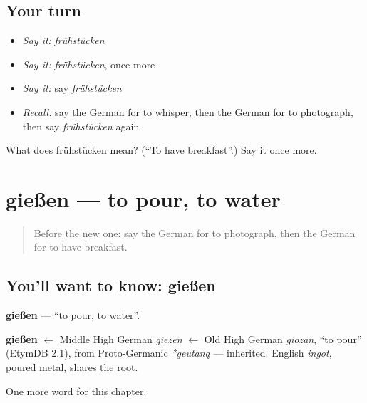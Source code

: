 \subsection*{Your turn}
\begin{itemize}
\raggedright
  \item \emph{Say it:} \emph{frühstücken}
  \item \emph{Say it:} \emph{frühstücken}, once more
  \item \emph{Say it:} say \emph{frühstücken}
  \item \emph{Recall:} say the German for to whisper, then the German for to photograph, then say \emph{frühstücken} again
\end{itemize}

\begin{tcolorbox}[breakable,colback=teal!4,colframe=teal!35!black,title={Before you move on}]
What does frühstücken mean? (\textquotedblleft{}To have breakfast\textquotedblright{}.) Say it once more.
\end{tcolorbox}
\section[gießen]{gießen — to pour, to water}

\label{lesson:GE-C181-giessen}



\begin{quote}
Before the new one: say the German for to photograph, then the German for to have breakfast.
\end{quote}

\subsection*{You'll want to know: gießen}
\textbf{gießen} — \textquotedblleft{}to pour, to water\textquotedblright{}.

\begin{cousinweb}
\textbf{gießen} $\leftarrow$ Middle High German \emph{giezen} $\leftarrow$ Old High German \emph{giozan}, \textquotedblleft{}to pour\textquotedblright{} (EtymDB 2.1), from Proto-Germanic \emph{*geutaną} — inherited. English \emph{ingot}, poured metal, shares the root.
\end{cousinweb}

\begin{grammarlens}[title={What you've built}]
One more word for this chapter.
\end{grammarlens}

